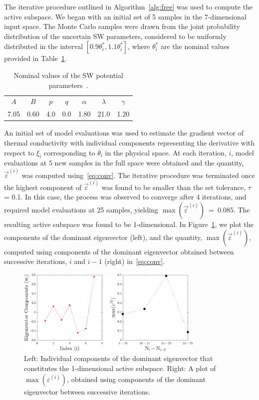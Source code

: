 The iterative procedure outlined in Algorithm~\ref{alg:free} was used to compute the active subspace. 
We began
with an initial set of 5 samples in the 7-dimensional input space. The Monte Carlo samples were drawn
from the joint probability distribution of the uncertain SW parameters, considered
to be uniformly distributed in the interval $[0.9\theta_i^\ast,1.1\theta_i^\ast]$, where $\theta_i^\ast$ are the
nominal values provided in Table~\ref{tab:sw}. 
%
\begin{table}[htbp]
\centering
{}
\begin{tabular}{@{}ccccccc@{}}\toprule
$A$ & $B$ & $p$ & $q$ & $\alpha$ & $\lambda$ & $\gamma$ \\
7.05 & 0.60 & 4.0 & 0.0 & 1.80 & 21.0 & 1.20 \\
\bottomrule
\end{tabular}
\caption{Nominal values of the SW potential parameters~\cite{Stillinger:1985}.}
\label{tab:sw}
\end{table}
%
An initial set of model evaluations was used to estimate the gradient vector of thermal conductivity with
individual components representing the derivative with respect to $\xi_i$ corresponding to $\theta_i$ in
the physical space. At each iteration, $i$, model evaluations at 5 new samples in the full space were 
obtained and the quantity, $\vec{\varepsilon}^{(i)}$ was computed using~\eqref{eq:conv}. The iterative
procedure was terminated once the highest component of $\vec{\varepsilon}^{(i)}$ was found to be smaller than
the set tolerance, $\tau$ = 0.1. In this case, the process was observed to converge after 4 iterations,
and required model evaluations at 25 samples, yielding $\max(\vec{\varepsilon}^{(i)})$~=~0.085.
 The resulting active subspace was found to be
1-dimensional. In Figure~\ref{fig:casfig1}, we plot the components of the dominant eigenvector (left),
and the quantity, $\max(\vec{\varepsilon}^{(i)})$, computed using components of the dominant eigenvector 
obtained between successive iterations, $i$ and $i-1$ (right) in~\eqref{eq:conv}.
%
\begin{figure}[htbp]
\begin{center}
\includegraphics[width=0.8\textwidth]{./Figures/free_eigv5}
\caption{Left: Individual components of the dominant eigenvector that constitutes the 1-dimensional
active subspace. Right: A plot of $\max(\varepsilon^{(i)})$, obtained
using components of the dominant eigenvector between successive iterations.}
\label{fig:casfig1}
\end{center}
\end{figure}
%

